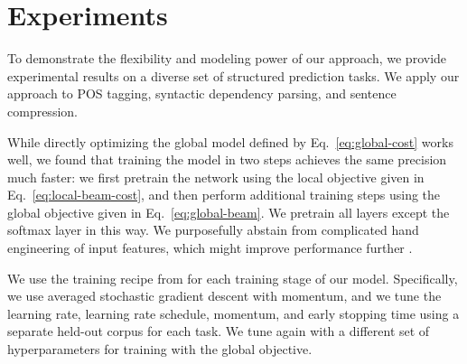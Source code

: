 \section{Experiments}
\label{sec:experiments}

To demonstrate the flexibility and modeling power of our approach, we provide
experimental results on a diverse set of structured prediction tasks.
We apply our approach to POS tagging, syntactic dependency parsing, and sentence
compression.

While directly optimizing the global model defined by Eq.~\eqref{eq:global-cost} works well,
we found that training the model in two steps
achieves the same precision much faster:
we first pretrain the network using the local objective given in Eq.~\eqref{eq:local-beam-cost},
and then perform additional training steps using the global objective given in Eq.~\eqref{eq:global-beam}.
We pretrain all layers except the softmax layer in this way.
We purposefully abstain from complicated hand engineering
of input features, 
which might improve performance further \cite{durrett-klein:2015:ACL}.

We use the training recipe from  for each training
stage of our model. Specifically, we use averaged stochastic gradient descent
with momentum, and we tune the learning rate, learning rate schedule,
momentum, and early stopping time using a separate held-out corpus for each
task. We tune again with a different set of hyperparameters for training with
the global objective. 





